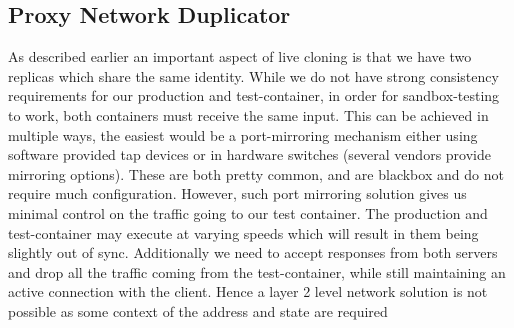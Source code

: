 \subsection{Proxy Network Duplicator} 
\label{sec:proxyDuplicator}

As described earlier an important aspect of live cloning is that we have two replicas which share the same identity. 
While we do not have strong consistency requirements for our production and test-container, in order for sandbox-testing to work, both containers must receive the same input.
This can be achieved in multiple ways, the easiest would be a port-mirroring mechanism either using software provided tap devices or in hardware switches (several vendors provide mirroring options). 
These are both pretty common, and are blackbox and do not require much configuration.
However, such port mirroring solution gives us minimal control on the traffic going to our test container.
The production and test-container may execute at varying speeds which will result in them being slightly out of sync.
Additionally we need to accept responses from both servers and drop all the traffic coming from the test-container, while still maintaining an active connection with the client.
Hence a layer 2 level network solution is not possible as some context of the address and state are required

